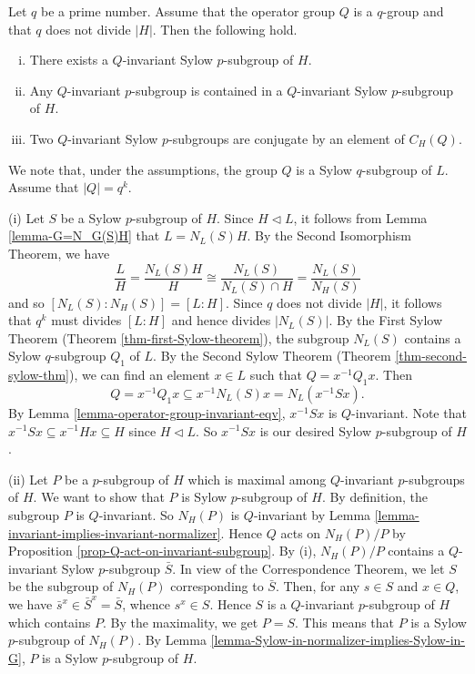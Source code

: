 \begin{theorem}
	Let $q$ be a prime number. Assume that the operator group $Q$ is a $q$-group and that $q$ does not divide $|H|$. Then the following hold.
	\begin{enumerate}[(i)]
		\item There exists a $Q$-invariant Sylow $p$-subgroup of $H$.
		\item Any $Q$-invariant $p$-subgroup is contained in a $Q$-invariant Sylow $p$-subgroup of $H$.
		\item Two $Q$-invariant Sylow $p$-subgroups are conjugate by an element of $C_H(Q)$.
	\end{enumerate}
\end{theorem}
\begin{sketch}
	We note that, under the assumptions, the group $Q$ is a Sylow $q$-subgroup of $L$. Assume that $|Q| = q^k$.
	
		(i) Let $S$ be a Sylow $p$-subgroup of $H$. Since $H \lhd L$, it follows from Lemma \ref{lemma-G=N_G(S)H} that $L = N_L(S)H$. By the Second Isomorphism Theorem, we have
		\begin{equation*}
			\frac{L}{H} = \frac{N_L(S)H}{H} \cong \frac{N_L(S)}{N_L(S) \cap H} =\frac{N_L(S)}{N_H(S)} 
		\end{equation*} and so $[N_L(S) : N_H(S)] = [L : H]$. Since $q$ does not divide $|H|$, it follows that $q^k$ must divides $[L:H]$ and hence divides $|N_L(S)|$. By the First Sylow Theorem (Theorem \ref{thm-first-Sylow-theorem}),  the subgroup $N_L(S)$ contains a Sylow $q$-subgroup $Q_1$ of $L$. By the Second Sylow Theorem (Theorem \ref{thm-second-sylow-thm}), we can find an element $x\in L$ such that $Q = x^{-1}Q_1x$. Then 
		\begin{equation*}
			Q = x^{-1}Q_1x \subseteq x^{-1}N_L(S)x = N_L(x^{-1}Sx).
		\end{equation*} 
		By Lemma \ref{lemma-operator-group-invariant-eqv}, $x^{-1}Sx$ is $Q$-invariant. Note that $x^{-1}Sx\subseteq x^{-1}Hx\subseteq H$  since $H\lhd L$. So $x^{-1}Sx$ is our desired Sylow $p$-subgroup of $H$. 
		
		
		
		(ii) Let $P$ be a $p$-subgroup of $H$ which is maximal among $Q$-invariant $p$-subgroups of $H$. We want to show that $P$ is Sylow $p$-subgroup of $H$. By definition, the subgroup $P$ is $Q$-invariant. So $N_H(P)$ is $Q$-invariant by Lemma \ref{lemma-invariant-implies-invariant-normalizer}. Hence $Q$ acts on $N_H(P)/P$ by Proposition \ref{prop-Q-act-on-invariant-subgroup}. By (i), $N_H(P)/P$ contains a $Q$-invariant Sylow $p$-subgroup $\bar{S}$. In view of the Correspondence Theorem, we let $S$ be the subgroup of $N_H(P)$ corresponding to $\bar{S}$. Then, for any $s \in S$ and $x \in Q$, we have $\bar{s}^x \in \bar{S}^x = \bar{S}$, whence $s^x \in S$. Hence $S$ is a $Q$-invariant $p$-subgroup of $H$ which contains $P$. By the maximality, we get $P=S$. This means that $P$ is a Sylow $p$-subgroup of $N_H(P)$. By Lemma \ref{lemma-Sylow-in-normalizer-implies-Sylow-in-G}, $P$ is a Sylow $p$-subgroup of $H$.
		

\end{sketch}
